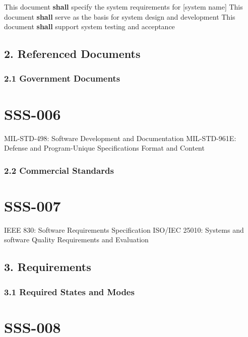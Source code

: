 This document \textbf{shall} specify the system requirements for [system name]
This document \textbf{shall} serve as the basis for system design and development
This document \textbf{shall} support system testing and acceptance

\subsection{2. Referenced Documents}

\subsubsection{2.1 Government Documents}

\section{SSS-006}\label{SSS-006}

MIL-STD-498: Software Development and Documentation
MIL-STD-961E: Defense and Program-Unique Specifications Format and Content\\

\subsubsection{2.2 Commercial Standards}

\section{SSS-007}\label{SSS-007}

IEEE 830: Software Requirements Specification
ISO/IEC 25010: Systems and software Quality Requirements and Evaluation\\

\subsection{3. Requirements}

\subsubsection{3.1 Required States and Modes}

\section{SSS-008}\label{SSS-008}

